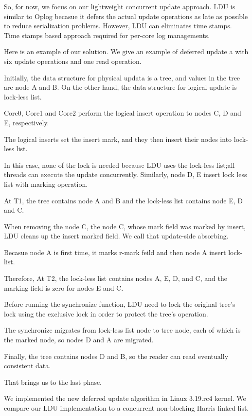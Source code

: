 So, for now, we focus on our lightweight concurrent update approach.
LDU is similar to Oplog becasue it defers the actual update operations as late
as possible to reduce serialization problems.
However, LDU can eliminates time stamps.
Time stamps based approach required for per-core log
managements.

Here is an example of our solution.
We give an example of deferred update a with six update operations and
one read operation.

Initially, the data structure for physical updata is a tree, and values
in the tree are node A and B.
On the other hand, the data structure for logical update is lock-less list.

Core0, Core1 and Core2 perform the
logical insert operation to nodes C, D and E, respectively.

The logical inserts set the insert mark, and they then insert their
nodes into lock-less list.

In this case, none of the lock is needed because LDU uses the lock-less
list;all threads can execute the update concurrently.
Similarly, node D, E insert lock less list with marking operation.

At T1, the tree contains node A and B and the lock-less list contains node
E, D and C.

When removing the node C, the node C, whose mark field was marked
by insert, LDU cleans up the insert marked field.
We call that update-side absorbing.

Becasue node A is first time, it marks r-mark feild and
then node A insert lock-list.

Therefore, At T2, the lock-less list contains nodes A, E, D, and C, and the
marking field is zero for nodes E and C.

Before running the synchronize function, LDU need to lock the original tree's
lock using the exclusive lock in order to protect the tree's operation.

The synchronize migrates from lock-less list node to tree node, each of 
which is the marked node, so nodes D and A are migrated.

Finally, the tree contains nodes D and B, so the reader can read eventually
consistent data.

That brings us to the last phase.

We implemented the new deferred update algorithm in Linux 3.19.rc4 kernel.
We compare our LDU implementation to a concurrent non-blocking Harris linked
list.

